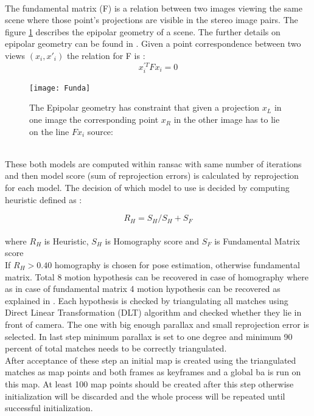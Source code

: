 \\
The fundamental matrix (F) is a relation between two images viewing the same scene where those point’s projections are visible in the stereo image pairs. The figure \ref{fig:F} describes the epipolar geometry of a scene. The further details on epipolar geometry can be found in \cite{multiview_geometry}. Given a point correspondence between two views 
$ (x_{i} , x{'}_{i}) $ the relation for F is : 
\begin{equation*}
x^{'T}_{i}Fx_{i} = 0    
\end{equation*}    
\newline
\begin{figure}[h]
	\centering
	\texttt{[image: Funda]}
	\caption{The Epipolar geometry has constraint that given a projection $ x_{L} $ in one image the corresponding point $ x_{R} $ in the other image has to lie on the line $ Fx_{i} $ source:\cite{multiview}}
	\label{fig:F}
\end{figure}
\\
These both models are computed within \acrshort{ransac} with same number of iterations and then model score (sum of reprojection errors) is calculated by reprojection for each model.
The decision of which model to use is decided by computing heuristic defined as : 

\begin{equation*}
R_{H} = S_{H} / {S_{H} + S_{F}}  
\end{equation*}  
\\ 
where $ R_{H} $ is Heuristic, $ S_{H} $ is Homography score and $ S_{F} $ is Fundamental Matrix score \\
\linebreak
If $ R_{H}  > 0.40 $ homography is chosen for pose estimation, otherwise fundamental matrix. 
Total 8 motion hypothesis can be recovered in case of homography where as in case of fundamental matrix 4 motion hypothesis can be recovered as explained in \cite{multiview_geometry}. Each hypothesis is checked by triangulating all matches using Direct Linear Transformation (DLT) algorithm \cite{multiview_geometry} and checked whether they lie in front of camera. The one with big enough parallax and small reprojection error is selected. In last step minimum parallax is set to one degree and minimum 90 percent of total matches needs to be correctly triangulated. \\
\linebreak
After acceptance of these step an initial map is created using the triangulated matches as map points and both frames as keyframes and a global \acrshort{ba} is run on this map. At least 100 map points should be created after this step otherwise initialization will be discarded and the whole process will be repeated until successful initialization. 

